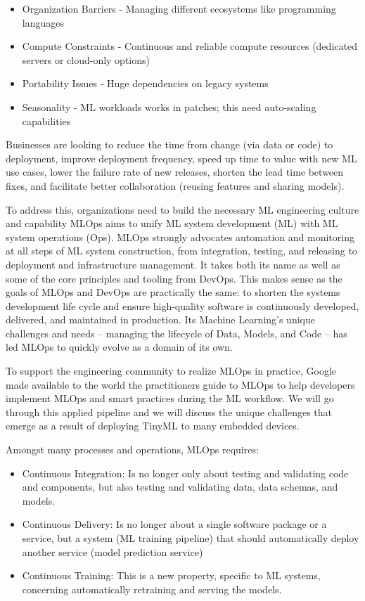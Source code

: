 \begin{itemize}
    \item Organization Barriers - Managing different ecosystems like programming languages
    \item Compute Constraints - Continuous and reliable compute resources (dedicated servers or cloud-only options)
    \item Portability Issues - Huge dependencies on legacy systems
    \item Seasonality - ML workloads works in patches; this need auto-scaling capabilities
\end{itemize}


Businesses are looking to reduce the time from change (via data or code) to deployment, improve deployment frequency, speed up time to value with new ML use cases, lower the failure rate of new releases, shorten the lead time between fixes, and facilitate better collaboration (reusing features and sharing models).

To address this, organizations need to build the necessary ML engineering culture and capability MLOps aims to unify ML system development (ML) with ML system operations (Ops). MLOps strongly advocates automation and monitoring at all steps of ML system construction, from integration, testing, and releasing to deployment and infrastructure management. It takes both its name as well as some of the core principles and tooling from DevOps. This makes sense as the goals of MLOps and DevOps are practically the same: to shorten the systems development life cycle and ensure high-quality software is continuously developed, delivered, and maintained in production. Its Machine Learning’s unique challenges and needs – managing the lifecycle of Data, Models, and Code – has led MLOps to quickly evolve as a domain of its own.

To support the engineering community to realize MLOps in practice, Google made available to the world the practitioners guide to MLOps to help developers implement MLOps and smart practices during the ML workflow. We will go through this applied pipeline and we will discuss the unique challenges that emerge as a result of deploying TinyML to many embedded devices.

Amongst many processes and operations, MLOps requires:

\begin{itemize}
    \item Continuous Integration: Is no longer only about testing and validating code and components, but also testing and validating data, data schemas, and models.
    \item Continuous Delivery: Is no longer about a single software package or a service, but a system (ML training pipeline) that should automatically deploy another service (model prediction service)
    \item Continuous Training: This is a new property, specific to ML systems, concerning automatically retraining and serving the models.
\end{itemize}

